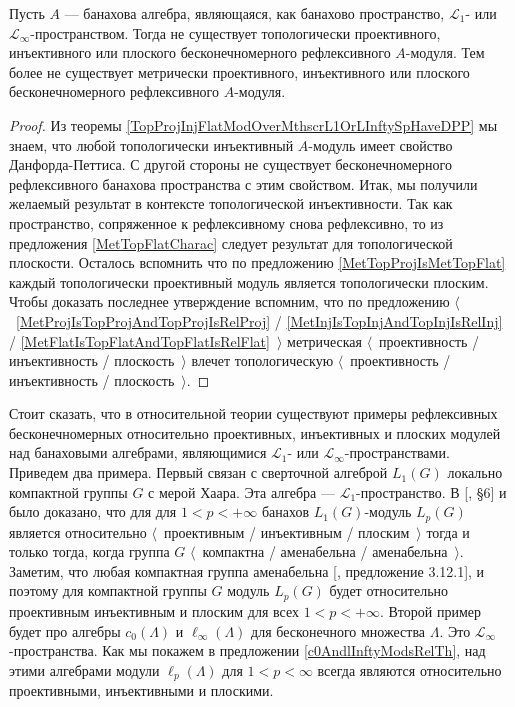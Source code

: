 \begin{corollary}\label{NoInfDimRefMetTopProjInjFlatModOverMthscrL1OrLInfty} Пусть $A$ --- банахова алгебра, являющаяся, как банахово пространство, $\mathscr{L}_1$- или $\mathscr{L}_\infty$-пространством. Тогда не существует топологически проективного, инъективного или плоского бесконечномерного рефлексивного $A$-модуля. Тем более не существует метрически проективного, инъективного или плоского бесконечномерного рефлексивного $A$-модуля.
\end{corollary}
\begin{proof} Из теоремы \ref{TopProjInjFlatModOverMthscrL1OrLInftySpHaveDPP} мы знаем, что любой топологически инъективный $A$-модуль имеет свойство Данфорда-Петтиса. С другой стороны не существует бесконечномерного рефлексивного банахова пространства с этим свойством. Итак, мы получили желаемый результат в контексте топологической инъективности. Так как пространство, сопряженное к рефлексивному снова рефлексивно, то из предложения \ref{MetTopFlatCharac} следует результат для топологической плоскости. Осталось вспомнить что по предложению \ref{MetTopProjIsMetTopFlat} каждый топологически проективный модуль является топологически плоским. Чтобы доказать последнее утверждение вспомним, что по предложению $\langle$~\ref{MetProjIsTopProjAndTopProjIsRelProj} / \ref{MetInjIsTopInjAndTopInjIsRelInj} / \ref{MetFlatIsTopFlatAndTopFlatIsRelFlat}~$\rangle$ метрическая $\langle$~проективность / инъективность / плоскость~$\rangle$ влечет топологическую $\langle$~проективность / инъективность / плоскость~$\rangle$.
\end{proof}

Стоит сказать, что в относительной теории существуют примеры рефлексивных бесконечномерных относительно проективных, инъективных и плоских модулей над банаховыми алгебрами, являющимися $\mathscr{L}_1$- или $\mathscr{L}_\infty$-пространствами. Приведем два примера. Первый связан с сверточной алгеброй $L_1(G)$ локально компактной группы $G$ с мерой Хаара. Эта алгебра --- $\mathscr{L}_1$-пространство. В [\cite{DalPolHomolPropGrAlg}, \S6] и \cite{RachInjModAndAmenGr} было доказано, что для для $1<p<+\infty$ банахов $L_1(G)$-модуль $L_p(G)$ является относительно $\langle$~проективным / инъективным / плоским~$\rangle$ тогда и только тогда, когда группа $G$  $\langle$~компактна / аменабельна / аменабельна~$\rangle$. Заметим, что любая компактная группа аменабельна [\cite{PierAmenLCA}, предложение 3.12.1], и поэтому для компактной группы $G$ модуль $L_p(G)$ будет относительно проективным инъективным и плоским для всех $1<p<+\infty$. Второй пример будет про алгебры $c_0(\Lambda)$ и $\ell_\infty(\Lambda)$ для бесконечного множества $\Lambda$. Это $\mathscr{L}_\infty$-пространства. Как мы покажем в предложении \ref{c0AndlInftyModsRelTh}, над этими алгебрами модули $\ell_p(\Lambda)$ для $1<p<\infty$ всегда являются относительно проективными, инъективными и плоскими. 

